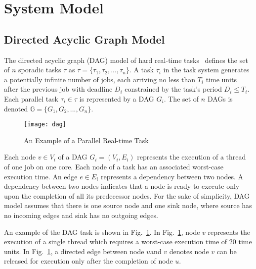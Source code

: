 \section{System Model}

\subsection{Directed Acyclic Graph Model}
The directed acyclic graph (DAG) model of hard real-time
tasks~\cite{li2014analysis} defines the set of ${n}$ sporadic tasks ${\tau}$ as
${\tau = \{\tau_1,\tau_2, ..., \tau_n\}}$. A task ${\tau_i}$
in the task system generates a potentially infinite number of jobs,
each arriving no less than ${T_i}$ time units after the previous
job with deadline ${D_i}$ constrained by the task's period
${D_i \leq T_i}$. Each parallel task ${\tau_i \in \tau}$
is represented by a DAG ${G_i}$. The set of ${n}$ DAGs is
denoted ${\mathbb{G} = \{G_1, G_2, ..., G_n\}}$.

\begin{figure}[!h]
  \centering
  \texttt{[image: dag]}
  \caption{An Example of a Parallel Real-time Task}
  \label{fig:dag}
\end{figure}
  


Each node ${v \in V_i}$ of a DAG ${G_i =
  (V_i, E_i)}$ represents the 
execution of a thread of one job on one core. Each node of a task has an associated worst-case execution time.  An edge ${e \in E_i}$ represents a
dependency between two nodes. A dependency between two nodes indicates
that a node is ready to execute only upon the completion of all its
predecessor nodes. For the sake of simplicity, DAG model assumes that there is one source node and one sink node, where source has no incoming edges and sink has no outgoing edges.


An example of the DAG task is shown in Fig.~\ref{fig:dag}. In Fig.~\ref{fig:dag}, node $v$ represents the execution of a single thread which requires a worst-case execution time of $20$ time units.  In Fig.~\ref{fig:dag}, a directed edge between node $u$and $v$ denotes node $v$ can be released for execution only after the completion of node $u$.

